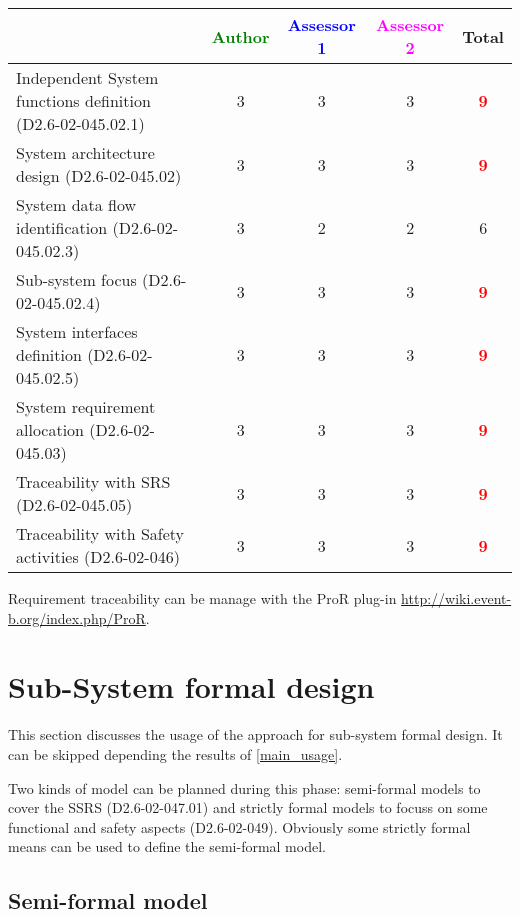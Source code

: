 \begin{tabular}{|l | c | c | c | c|}
\hline
& \textcolor{green}{Author} & \textcolor{blue}{Assessor 1} & \textcolor{magenta}{Assessor 2} & Total \\
\hline
Independent System functions definition (D2.6-02-045.02.1)  & 3     & 3     & 3     & \textcolor{red}{\textbf{9}} \\
\hline 
System architecture design (D2.6-02-045.02) & 3     & 3     & 3     & \textcolor{red}{\textbf{9}} \\
\hline
System data flow identification (D2.6-02-045.02.3)  & 3     & 2     & 2     &  6 \\
\hline
Sub-system focus (D2.6-02-045.02.4)  & 3     & 3     & 3     & \textcolor{red}{\textbf{9}} \\
\hline
System interfaces definition (D2.6-02-045.02.5)  & 3     & 3     & 3     & \textcolor{red}{\textbf{9}}  \\
\hline
System requirement allocation (D2.6-02-045.03)  & 3     & 3     & 3     & \textcolor{red}{\textbf{9}} \\
\hline
Traceability with SRS (D2.6-02-045.05)  & 3     & 3     & 3     & \textcolor{red}{\textbf{9}} \\
\hline
Traceability with Safety activities (D2.6-02-046)  & 3     & 3     & 3     & \textcolor{red}{\textbf{9}} \\
\hline
\end{tabular}

\begin{author_comment}
Requirement traceability can be manage with the ProR plug-in \url{http://wiki.event-b.org/index.php/ProR}.
\end{author_comment}

\section{Sub-System formal design}
This section discusses the usage of the approach for sub-system formal design.
It can be skipped depending the results of \ref{main_usage}.

Two kinds of model can be planned during this phase: semi-formal models to  cover the SSRS (D2.6-02-047.01) and strictly formal  models to  focuss on some functional and safety aspects (D2.6-02-049).  Obviously some strictly  formal means can be used to define the semi-formal  model.

\subsection{Semi-formal model}


